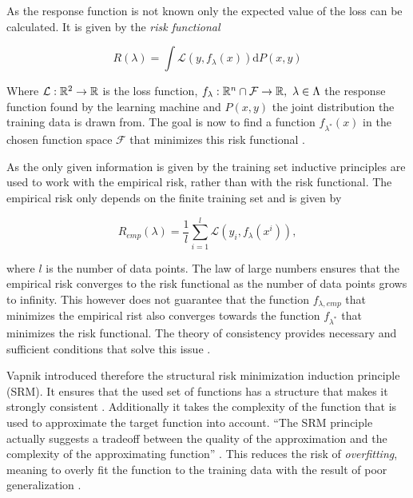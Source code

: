 As the response function is not known only the expected value of the loss can be calculated. It is given by the \emph{risk functional} 

\begin{equation}
	R(\lambda) = \int{\mathcal{L}(y,f_{\lambda}(x))\text{d}P(x,y)}
\label{risk_func}
\end{equation}

Where \(\mathcal{L}: \mathbb{R}^2 \to \mathbb{R}\) is the loss function, \(f_{\lambda}: \mathbb{R}^{n}\cap\mathcal{F} \to \mathbb{R}, ~ \lambda \in \Lambda\) the response function found by the learning machine and \(P(x,y)\) the joint distribution the training data is drawn from. The goal is now to find a function \(f_{\lambda^*}(x)\) in the chosen function space \(\mathcal{F}\) that minimizes this risk functional \cite{Vapnik1999}.

As the only given information is given by the training set inductive principles are used to work with the empirical risk, rather than with the risk functional.
The empirical risk only depends on the finite training set  and is given by 


\begin{equation}
	R_{emp}(\lambda) = \frac{1}{l} \sum_{i = 1}^{l}\mathcal{L}(y_i,f_{\lambda}(x^i)),
\label{emp_risk}
\end{equation}

where \(l\) is the number of data points.
The law of large numbers ensures that the empirical risk converges to the risk functional as the number of data points grows to infinity. This however does not guarantee that the function \(f_{\lambda,emp}\) that minimizes the empirical rist also converges towards the function \(f_{\lambda^*}\) that minimizes the risk functional.
The theory of consistency provides necessary and sufficient conditions that solve this issue \cite{Vapnik1999}.

Vapnik introduced therefore the structural risk minimization induction principle (SRM). It ensures that the used set of functions has a structure that makes it strongly consistent \cite{Vapnik1999}. Additionally it takes the complexity of the function that is used to approximate the target function into account. ``The SRM principle actually suggests a tradeoff between the quality of the approximation and the complexity of the approximating function'' \cite{Vapnik1999}.
This reduces the risk of \emph{overfitting}, meaning to overly fit the function to the training data with the result of poor generalization \cite{Cristianini2000}.

